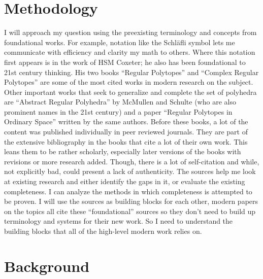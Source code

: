 \documentclass{article}
\begin{document}
\section{Methodology}
I will approach my question using the preexisting terminology and concepts from foundational works. 
For example, notation like the Schläfli symbol lets me communicate with efficiency and clarity my math to others. 
Where this notation first appears is in the work of HSM Coxeter; he also has been foundational to 21st century thinking. 
His two books “Regular Polytopes” and “Complex Regular Polytopes” are some of the most cited works in modern research on the subject. 
Other important works that seek to generalize and complete the set of polyhedra are “Abstract Regular Polyhedra” by McMullen and Schulte 
(who are also prominent names in the 21st century) and a paper “Regular Polytopes in Ordinary Space” written by the same authors. 
Before these books, a lot of the content was published individually in peer reviewed journals. 
They are part of the extensive bibliography in the books that cite a lot of their own work. This leans them to be rather scholarly, 
especially later versions of the books with revisions or more research added. Though, there is a lot of self-citation and while, not explicitly bad, 
could present a lack of authenticity. The sources help me look at existing research and either identify the gaps in it, or evaluate the existing completeness. 
I can analyze the methods in which completeness is attempted to be proven. I will use the sources as building blocks for each other, 
modern papers on the topics all cite these “foundational” sources so they don’t need to build up terminology and systems for their new work. 
So I need to understand the building blocks that all of the high-level modern work relies on.

\section{Background}
\end{document}
